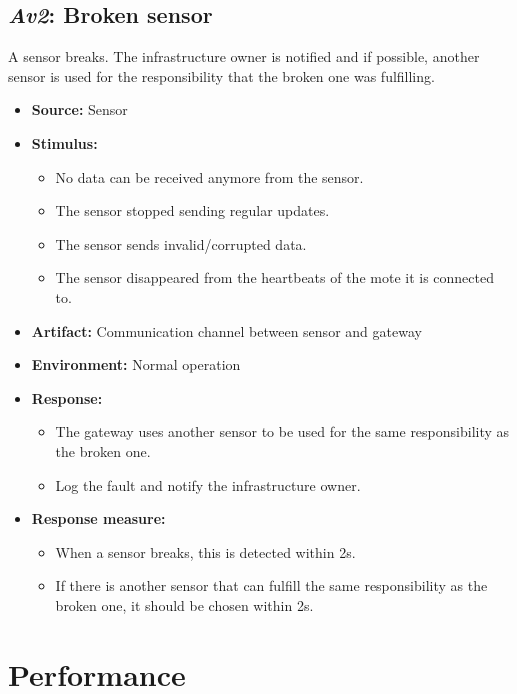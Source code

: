 \subsection{\emph{Av2}: Broken sensor}
A sensor breaks. The infrastructure owner is notified and if possible, another
sensor is used for the responsibility that the broken one was fulfilling.

\begin{itemize}
    \item \textbf{Source:} Sensor
    \item \textbf{Stimulus:}
        \begin{itemize}
            \item No data can be received anymore from the sensor.
            \item The sensor stopped sending regular updates.
            \item The sensor sends invalid/corrupted data.
            \item The sensor disappeared from the heartbeats of the mote it
                  is connected to.
        \end{itemize}

    \item \textbf{Artifact:} Communication channel between sensor and gateway
    \item \textbf{Environment:} Normal operation
    \item \textbf{Response:}
        \begin{itemize}
            \item The gateway uses another sensor to be used for
                  the same responsibility as the broken one.
            \item Log the fault and notify the infrastructure owner.
        \end{itemize}

    \item \textbf{Response measure:}
        \begin{itemize}
            \item When a sensor breaks, this is detected within 2s.
            \item If there is another sensor that can fulfill the same responsibility
                  as the broken one, it should be chosen within 2s.
        \end{itemize}
\end{itemize}

\section{Performance}
